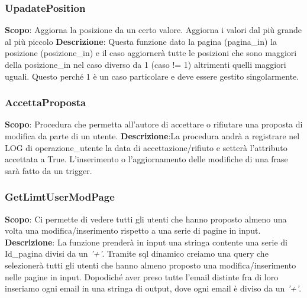 \newpage
\hypertarget{UpadatePosition}{}
\subsubsection{UpadatePosition}
\textbf{Scopo}: Aggiorna la posizione da un certo valore. Aggiorna i valori dal più grande al più piccolo\newline\newline
\textbf{Descrizione}: Questa funzione dato la pagina (pagina\_in) la posizione (posizione\_in) e il caso aggiornerà tutte le posizioni che sono maggiori della posizione\_in nel caso diverso da 1 (caso != 1) altrimenti quelli maggiori uguali. Questo perché 1 è un caso particolare e deve essere gestito singolarmente.\newline


\newpage
\subsubsection{AccettaProposta}
\textbf{Scopo}: Procedura che permetta all'autore di accettare o rifiutare una proposta di modifica da parte di un utente.\newline\newline
\textbf{Descrizione}:La procedura andrà a registrare nel LOG di operazione\_utente la data di accettazione/rifiuto e setterà l'attributo accettata a True. L'inserimento o l'aggiornamento delle modifiche di una frase sarà fatto da un trigger.\newline



\newpage
\subsubsection{GetLimtUserModPage}
\textbf{Scopo}: Ci permette di vedere tutti gli utenti che hanno proposto almeno una volta una modifica/inserimento rispetto a una serie di pagine in input.\newline\newline
\textbf{Descrizione}: La funzione prenderà in input una stringa contente una serie di Id\_pagina divisi da un \textit{'+'}. Tramite sql dinamico creiamo una query che selezionerà tutti gli utenti che hanno almeno proposto una modifica/inserimento nelle pagine in input. Dopodiché aver preso tutte l'email distinte fra di loro  inseriamo ogni email in una stringa di output, dove ogni email è diviso da un \textit{'+'}.\newline


